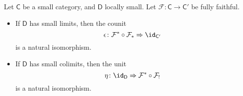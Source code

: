 \documentclass[notes.tex]{subfiles}
\begin{document}
\begin{theorem}
  \label{thm:kan_extension_along_fully_faithful_functor_counit_isomorphism}
  Let $\mathsf{C}$ be a small category, and $\mathsf{D}$ locally small. Let $\mathcal{F}\colon \mathsf{C} \to \mathsf{C'}$ be fully faithful.
  \begin{itemize}
    \item If $\mathsf{D}$ has small limits, then the counit
      \begin{equation*}
        \epsilon\colon \mathcal{F}^{*} \circ \mathcal{F}_{*} \Rightarrow \id_{\mathsf{C}'}
      \end{equation*}
      is a natural isomorphism.

    \item If $\mathsf{D}$ has small colimits, then the unit
      \begin{equation*}
        \eta\colon \id_{\mathsf{D}} \Rightarrow \mathcal{F}^{*} \circ \mathcal{F}_{!}
      \end{equation*}
      is a natural isomorphism.
  \end{itemize}
\end{theorem}
\end{document}
